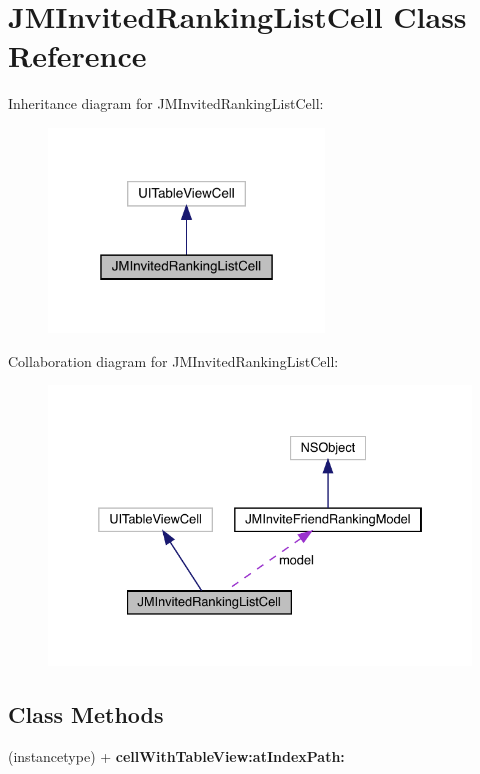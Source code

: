 \hypertarget{interface_j_m_invited_ranking_list_cell}{}\section{J\+M\+Invited\+Ranking\+List\+Cell Class Reference}
\label{interface_j_m_invited_ranking_list_cell}


Inheritance diagram for J\+M\+Invited\+Ranking\+List\+Cell\+:\nopagebreak
\begin{figure}[H]
\begin{center}
\leavevmode
\includegraphics[width=208pt]{interface_j_m_invited_ranking_list_cell__inherit__graph}
\end{center}
\end{figure}


Collaboration diagram for J\+M\+Invited\+Ranking\+List\+Cell\+:\nopagebreak
\begin{figure}[H]
\begin{center}
\leavevmode
\includegraphics[width=332pt]{interface_j_m_invited_ranking_list_cell__coll__graph}
\end{center}
\end{figure}
\subsection*{Class Methods}
\begin{DoxyCompactItemize}
\item 
\mbox{\label{interface_j_m_invited_ranking_list_cell_a8ddf2df6a345cb1291cb46cc5df6b624}} 
(instancetype) + {\bfseries cell\+With\+Table\+View\+:at\+Index\+Path\+:}
\end{DoxyCompactItemize}
